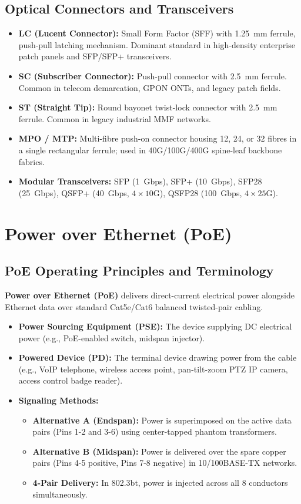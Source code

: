 \subsection{Optical Connectors and Transceivers}
\begin{itemize}[leftmargin=*]
    \item \textbf{LC (Lucent Connector):} Small Form Factor (SFF) with 1.25~mm ferrule, push-pull latching mechanism. Dominant standard in high-density enterprise patch panels and SFP/SFP+ transceivers.
    \item \textbf{SC (Subscriber Connector):} Push-pull connector with 2.5~mm ferrule. Common in telecom demarcation, GPON ONTs, and legacy patch fields.
    \item \textbf{ST (Straight Tip):} Round bayonet twist-lock connector with 2.5~mm ferrule. Common in legacy industrial MMF networks.
    \item \textbf{MPO / MTP:} Multi-fibre push-on connector housing 12, 24, or 32 fibres in a single rectangular ferrule; used in 40G/100G/400G spine-leaf backbone fabrics.
    \item \textbf{Modular Transceivers:} SFP (1~Gbps), SFP+ (10~Gbps), SFP28 (25~Gbps), QSFP+ (40~Gbps, $4\times 10\text{G}$), QSFP28 (100~Gbps, $4\times 25\text{G}$).
\end{itemize}

\section{Power over Ethernet (PoE)}

\subsection{PoE Operating Principles and Terminology}
\textbf{Power over Ethernet (PoE)} delivers direct-current electrical power alongside Ethernet data over standard Cat5e/Cat6 balanced twisted-pair cabling.
\begin{itemize}[leftmargin=*]
    \item \textbf{Power Sourcing Equipment (PSE):} The device supplying DC electrical power (e.g., PoE-enabled switch, midspan injector).
    \item \textbf{Powered Device (PD):} The terminal device drawing power from the cable (e.g., VoIP telephone, wireless access point, pan-tilt-zoom PTZ IP camera, access control badge reader).
    \item \textbf{Signaling Methods:}
    \begin{itemize}
        \item \textbf{Alternative A (Endspan):} Power is superimposed on the active data pairs (Pins 1-2 and 3-6) using center-tapped phantom transformers.
        \item \textbf{Alternative B (Midspan):} Power is delivered over the spare copper pairs (Pins 4-5 positive, Pins 7-8 negative) in 10/100BASE-TX networks.
        \item \textbf{4-Pair Delivery:} In 802.3bt, power is injected across all 8 conductors simultaneously.
    \end{itemize}
\end{itemize}

